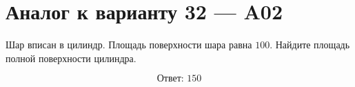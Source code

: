 \documentclass[12pt,a4paper]{article}
\begin{document}
\section*{Аналог к варианту 32 — A02}

Шар вписан в цилиндр. Площадь поверхности шара равна \(100\). Найдите площадь полной поверхности цилиндра.

\begin{center}
\end{center}

\[
\boxed{\text{Ответ: }150}
\]
\end{document}
